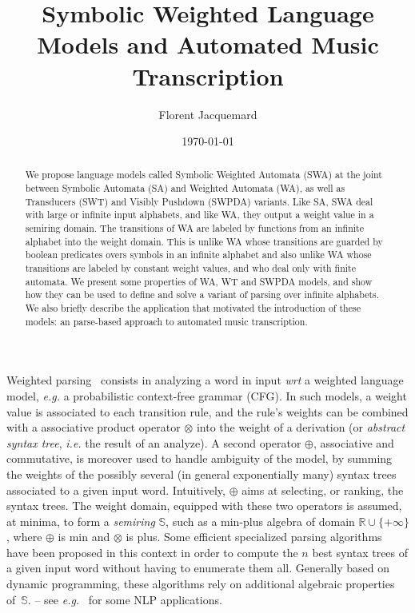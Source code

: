\documentclass[runningheads]{llncs}
\title{Symbolic Weighted Language Models and Automated Music Transcription}
\author{Florent Jacquemard}
\institute{INRIA \& CNAM, Paris, France\\
\email{florent.jacquemard@inria.fr}}
\date{\today}
\def\ie{\textit{i.e.}\xspace}
\def\eg{\textit{e.g.}\xspace}
\def\wrt{\textit{wrt}\xspace}
\newcommand{\Semiring}{\mathbb{S}}
\begin{document}
\thispagestyle{empty}
\maketitle

\begin{abstract}

We propose language models called Symbolic Weighted Automata (SWA) 
at the joint %
between Symbolic Automata (SA) and Weighted Automata (WA), 
as well as Transducers (SWT) and Visibly Pushdown (SWPDA) variants.
%
Like SA, SWA deal with large or infinite input alphabets, 
and like WA, they output a weight value in a semiring domain.
The transitions of WA are labeled by functions from an infinite alphabet into the weight domain. 
This is unlike WA whose transitions are guarded by boolean predicates 
overs symbols in an infinite alphabet 
and also unlike WA whose transitions are labeled by constant weight values, 
and who deal only with finite automata.
%
We present some properties of WA, WT and SWPDA models, 
and show how they can be used to define and solve a variant of parsing 
over infinite alphabets.
%
We also briefly describe the application that motivated the introduction of these models: 
an parse-based approach to automated music transcription.
\end{abstract}




Weighted parsing~\cite{Goodman99SemiringParsing,Nederhof03weightedParsing,MorbitzVogler19weighted-parsing} 
consists in analyzing a word in input \wrt a weighted language model, \eg a probabilistic context-free grammar (CFG).
In such models, a weight value is associated to each transition rule, %
and the rule's weights can be combined with a associative product operator $\otimes$ into 
the weight of a derivation (or \emph{abstract syntax tree}, \ie the result of an analyze).
A second operator $\oplus$, associative and commutative, 
is moreover used to handle ambiguity of the model, 
by summing the weights of the possibly several (in general exponentially many) 
syntax trees associated to a given input word.
Intuitively, $\oplus$ aims at selecting, or ranking, the syntax trees.
The weight domain, equipped with these two operators is assumed, at minima, 
to form a \emph{semiring} $\Semiring$, %
such as a min-plus algebra of domain $\mathbb{R} \cup \{ +\infty\}$, 
where $\oplus$ is min and $\otimes$ is plus.
Some efficient specialized parsing algorithms~\cite{Huang05kbest} have been proposed in this context 
in order to compute the $n$ best syntax trees of a given input word without having to enumerate them all.
Generally based on dynamic programming, these algorithms rely on 
additional algebraic properties of~$\Semiring$.
-- see \eg~\cite{Huang05kbest} for some NLP applications.
\end{document}
